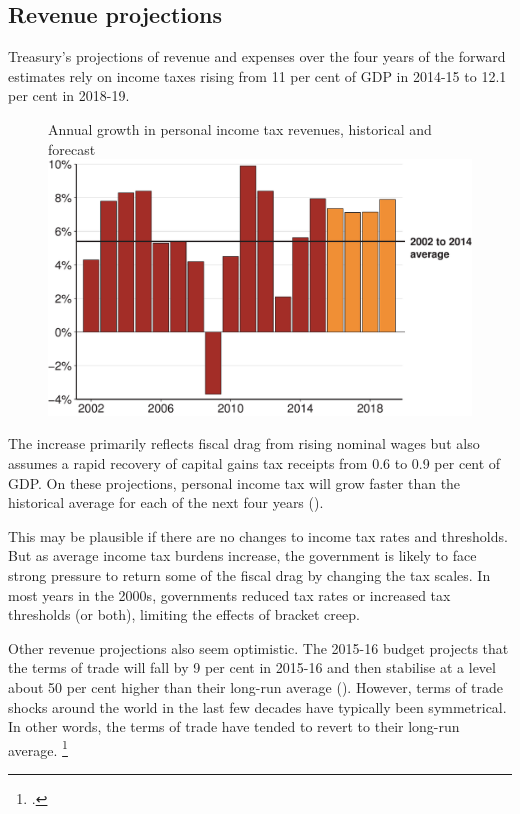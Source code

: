 \subsection{Revenue projections}
Treasury’s projections of revenue and expenses over the four years of the forward estimates rely on income taxes rising from 11 per cent of GDP in 2014-15 to 12.1 per cent in 2018-19. 

\begin{figure}
%
{Annual growth in personal income tax revenues, historical and forecast}%
\includegraphics[width=\columnwidth]{Fiscal-challenges/figure/Figure6-1.pdf}
\end{figure}

The increase primarily reflects fiscal drag from rising nominal wages but also assumes a rapid recovery of capital gains tax receipts from 0.6 to 0.9 per cent of GDP\@. On these projections, personal income tax will grow faster than the historical average for each of the next four years (). 

This may be plausible if there are no changes to income tax rates and thresholds. But as average income tax burdens increase, the government is likely to face strong pressure to return some of the fiscal drag by changing the tax scales. In most years in the 2000s, governments reduced tax rates or increased tax thresholds (or both), limiting the effects of bracket creep.  

Other revenue projections also seem optimistic. The 2015-16 budget projects that the terms of trade will fall by 9 per cent in 2015-16 and then stabilise at a level about 50 per cent higher than their long-run average (). However, terms of trade shocks around the world in the last few decades have typically been symmetrical. In other words, the terms of trade have tended to revert to their long-run average. \footcite[][34--35]{MinifieCherastidthamMullerworthEtAl2013} 

